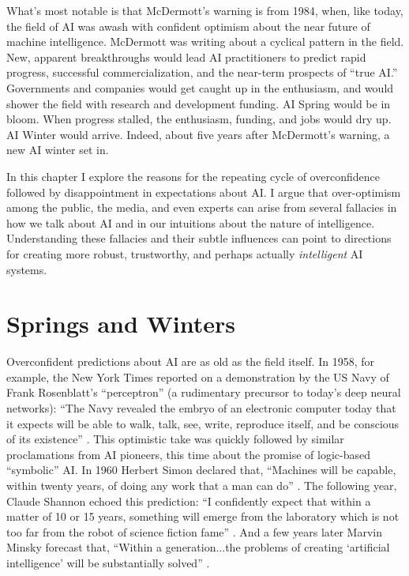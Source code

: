 \documentclass{article}
\begin{document}
What's most notable is that McDermott's warning is from 1984, when, like today, the field of AI was awash with confident optimism about the near future of machine intelligence. McDermott was writing about a cyclical pattern in the field.  New, apparent breakthroughs would lead AI practitioners to predict rapid progress, successful commercialization, and the near-term prospects of ``true AI.'' Governments and companies would get caught up in the enthusiasm, and would shower the field with research and development funding.  AI Spring would be in bloom.  When progress stalled, the enthusiasm, funding, and jobs would dry up. AI Winter would arrive.  Indeed, about five years after McDermott's warning, a new AI winter set in.

In this chapter I explore the reasons for the repeating cycle of overconfidence followed by disappointment in expectations about AI.  I argue that over-optimism among the public, the media, and even experts can arise from several fallacies in how we talk about AI and in our intuitions about the nature of intelligence.  Understanding these fallacies and their subtle influences can point to directions for creating more robust, trustworthy, and perhaps actually \textit{intelligent} AI systems.

\section*{Springs and Winters}
Overconfident predictions about AI are as old as the field itself.  In 1958, for example, the New York Times reported on a demonstration by the US Navy of Frank Rosenblatt's ``perceptron'' (a rudimentary precursor to today's deep neural networks): ``The Navy revealed the embryo of an electronic computer today that it expects will be able to walk, talk, see, write, reproduce itself, and be conscious of its existence'' \cite{NYT1958}.  This optimistic take was quickly followed by similar proclamations from AI pioneers, this time about the promise of logic-based ``symbolic'' AI.  In 1960 Herbert Simon declared that, ``Machines will be capable, within twenty years, of doing any work that a man can do'' \cite{Simon1960}.  The following year, Claude Shannon echoed this prediction: ``I confidently expect that within a matter of 10 or 15 years, something will emerge from the laboratory which is not too far from the robot of science fiction fame'' \cite{Shannon1961}. And a few years later Marvin Minsky forecast that, ``Within a generation...the problems of creating ‘artificial intelligence' will be substantially solved'' \cite{Minsky1967}.
\end{document}
